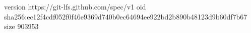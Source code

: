 version https://git-lfs.github.com/spec/v1
oid sha256:ec12f4cdf052f0f46e9369d740b0ec64694ee922bd2b890b48123d9b60df7b67
size 903953
